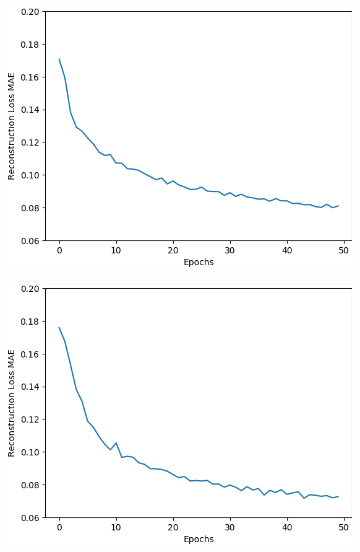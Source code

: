 \renewcommand{\thesubfigure}{\arabic{subfigure}}
\begin{figure}[H]
    \centering
    \begin{subfigure}{.25\textwidth}
        \centering
        \includegraphics[width=\textwidth]
        {images/figures/experiments_architecture/mae_graphKernel3adjusted2x2x256_dim1024.png}
        \caption{}
    \end{subfigure}%
    \begin{subfigure}{.25\textwidth}
        \centering
        \includegraphics[width=\textwidth]
        {images/figures/experiments_architecture/mae_graphKernel3adjusted4x4x128_dim1024.png}
        \caption{}
    \end{subfigure}%

\end{figure}
